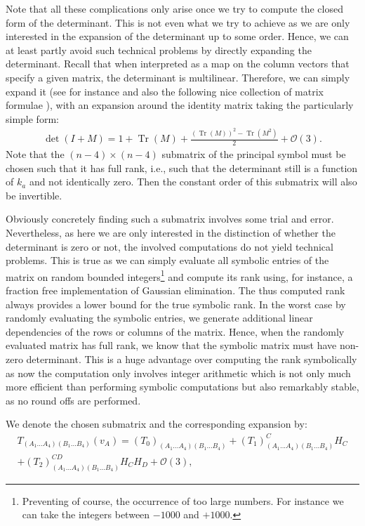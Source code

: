 Note that all these complications only arise once we try to compute the closed form of the determinant. This is not even what we try to achieve as we are only interested in the expansion of the determinant up to some order. Hence, we can at least partly avoid such technical problems by directly expanding the determinant. Recall that when interpreted as a map on the column vectors that specify a given matrix, the determinant is multilinear. Therefore, we can simply expand it (see for instance \cite{2008CoTPh..49..801Z} and also the following nice collection of matrix formulae \cite{IMM2012-03274}), with an expansion around the identity matrix taking the particularly simple form:
\begin{align}\label{detExp}
    \operatorname{det}(I+M) = 1 + \operatorname{Tr}(M) + \frac{(\operatorname{Tr}(M))^2- \operatorname{Tr}(M^2)}{2} + \mathcal{O}(3). 
\end{align}
Note that the $(n-4)\times (n-4)$ submatrix of the principal symbol must be chosen such that it has full rank, i.e., such that the determinant still is a function of $k_a$ and not identically zero. 
Then
the constant order of this submatrix will also be invertible.
\begin{remark}
Obviously concretely finding such a submatrix involves some trial and error. Nevertheless, as here we are only interested in the distinction of whether the determinant is zero or not, the involved computations do not yield technical problems. This is true as we can simply evaluate all symbolic entries of the matrix on random bounded integers\footnote{Preventing of course, the occurrence of too large numbers. For instance we can take the integers between $-1000$ and $+1000$.} and compute its rank using, for instance, a fraction free implementation of Gaussian elimination. The thus computed rank always provides a lower bound for the true symbolic rank. In the worst case by randomly evaluating the symbolic entries, we generate additional linear dependencies of the rows or columns of the matrix. Hence, when the randomly evaluated matrix has full rank, we know that the symbolic matrix must have non-zero determinant. This is a huge advantage over computing the rank symbolically as now the computation only involves integer arithmetic which is not only much more efficient than performing symbolic computations but also remarkably stable, as no round offs are performed.
\end{remark}
We denote the chosen submatrix and the corresponding expansion by:
\begin{multline}
    T_{(A_1...A_4)(B_1...B_4)}(v_A) = (T_0)_{(A_1...A_4)(B_1...B_4)} + (T_1)_{(A_1...A_4)(B_1...B_4)}^{C} H_C \\
    +(T_2)_{(A_1...A_4)(B_1...B_4)}^{CD} H_C H_D + \mathcal{O}(3),
\end{multline}
